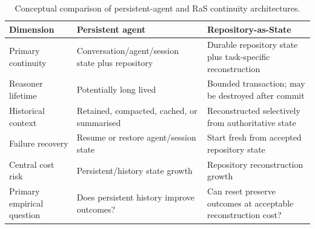 \begin{table}[htbp]
\centering
\small
\caption{Conceptual comparison of persistent-agent and RaS continuity architectures.}
\label{tab:persistent-vs-ras}
\begin{tabularx}{\textwidth}{@{}lX X@{}}
\toprule
Dimension & Persistent agent & Repository-as-State \\
\midrule
Primary continuity & Conversation/agent/session state plus repository & Durable repository state plus task-specific reconstruction \\
Reasoner lifetime & Potentially long lived & Bounded transaction; may be destroyed after commit \\
Historical context & Retained, compacted, cached, or summarised & Reconstructed selectively from authoritative state \\
Failure recovery & Resume or restore agent/session state & Start fresh from accepted repository state \\
Central cost risk & Persistent/history state growth & Repository reconstruction growth \\
Primary empirical question & Does persistent history improve outcomes? & Can reset preserve outcomes at acceptable reconstruction cost? \\
\bottomrule
\end{tabularx}
\end{table}
